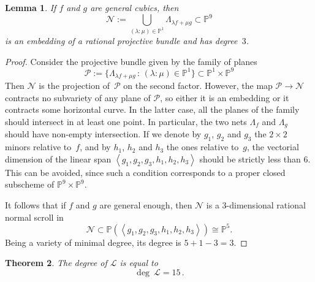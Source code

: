 \documentclass{amsart}
\theoremstyle{plain}
\newtheorem{lemma}{Lemma}[section]
\newtheorem{theorem}[lemma]{Theorem}
\theoremstyle{definition}
\newcommand{\p}{\mathbb{P}}
\newcommand{\sL}{\mathcal{L}}
\begin{document}
\begin{lemma}
\label{lemma:scroll}
If $f$ and $g$ are general cubics, then
%
\[
  \mathcal{N} := \bigcup_{(\lambda : \mu) \in \p^1} \Lambda_{\lambda f + \mu g} \subset \p^9
\]
%
is an embedding of a rational projective bundle and has degree~$3$.
\end{lemma}
\begin{proof}
Consider the projective bundle given by the family of planes
%
\[
  \mathcal{P} := \{ \Lambda_{\lambda f + \mu g} \, : \, (\lambda: \mu) \in \p^1 \} \subset \p^1 \times \p^9
\]
%
Then $\mathcal{N}$ is the projection of~$\mathcal{P}$ on the second factor.
However, the map $\mathcal{P} \to \mathcal{N}$ contracts no subvariety of any plane of $\mathcal{P}$, so either it is an embedding or it contracts some horizontal curve. In the latter case, all the planes of the family should intersect in at least one point. In particular, the two nets $\Lambda_f$ and $\Lambda_g$ should have non-empty intersection.
If we denote by $g_1$, $g_2$ and $g_3$ the $2 \times 2$ minors relative to~$f$, and by $h_1$, $h_2$ and $h_3$ the ones relative to~$g$, the vectorial dimension of the linear span $\left\langle g_1, g_2, g_3, h_1, h_2, h_3 \right\rangle$ should be strictly less than $6$. This can be avoided, since such a condition corresponds to a proper closed subscheme of $\p^9 \times \p^9$.

It follows that if $f$ and $g$ are general enough, then $\mathcal{N}$ is a $3$-dimensional rational normal scroll in
%
\[
  \mathcal{N} \subset \p(\left\langle g_1, g_2, g_3, h_1, h_2, h_3 \right\rangle) \cong \p^5.
\]
%
Being a variety of minimal degree, its degree is $5+1-3 = 3$.
\end{proof}

\begin{theorem}
The degree of $\sL$ is equal to
%
\[
  \deg \ \sL = 15 \,.
\]
%
\end{theorem}
\end{document}
